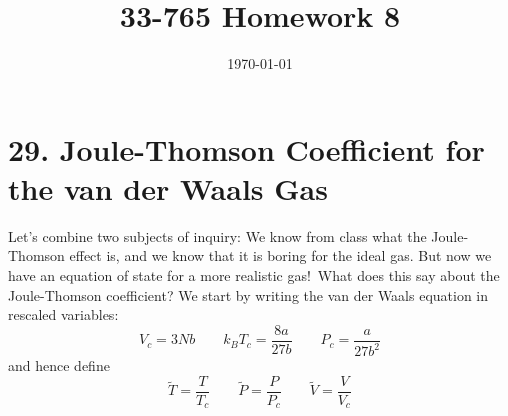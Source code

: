 \documentclass[a4paper,twoside]{article}
\title{33-765 Homework 8}
\date{\today}
\begin{document}
\maketitle

\section*{29. Joule-Thomson Coefficient for the van der Waals Gas}
Let's combine two subjects of inquiry: We know from class what the Joule-Thomson effect is, and we know that it is boring for the ideal gas. But now we have an equation of state for a more realistic gas!\ What does this say about the Joule-Thomson coefficient? We start by writing the van der Waals equation in rescaled variables:
\begin{equation}
    V_c = 3Nb \qquad k_B T_c = \frac{8a}{27b} \qquad P_c = \frac{a}{27b^2}
\end{equation}
and hence define
\begin{equation}
    \tilde{T} = \frac{T}{T_c} \qquad \tilde{P} = \frac{P}{P_c} \qquad \tilde{V} = \frac{V}{V_c}
\end{equation}
\end{document}
